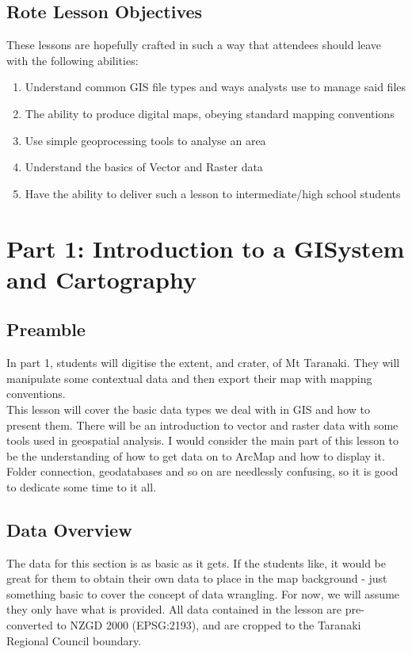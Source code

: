 \documentclass{article}
\begin{document}
\subsection{Rote Lesson Objectives}
These lessons are hopefully crafted in such a way that attendees should leave with the following abilities:
\begin{enumerate}
	\item Understand common GIS file types and ways analysts use to manage said files
	\item The ability to produce digital maps, obeying standard mapping conventions
	\item Use simple geoprocessing tools to analyse an area
	\item Understand the basics of Vector and Raster data
	\item Have the ability to deliver such a lesson to intermediate/high school students
\end{enumerate}
\pagebreak

\section{Part 1: Introduction to a GISystem and Cartography}
\subsection{Preamble}
In part 1, students will digitise the extent, and crater, of Mt Taranaki. They will manipulate some contextual data and then export their map with mapping conventions. \\

This lesson will cover the basic data types we deal with in GIS and how to present them. There will be an introduction to vector and raster data with some tools used in geospatial analysis. I would consider the main part of this lesson to be the understanding of how to get data on to ArcMap and how to display it. Folder connection, geodatabases and so on are needlessly confusing, so it is good to dedicate some time to it all. 

\subsection{Data Overview}
The data for this section is as basic as it gets. If the students like, it would be great for them to obtain their own data to place in the map background - just something basic to cover the concept of data wrangling. For now, we will assume they only have what is provided. All data contained in the lesson are pre-converted to NZGD 2000 (EPSG:2193), and are cropped to the Taranaki Regional Council boundary. 
\end{document}

